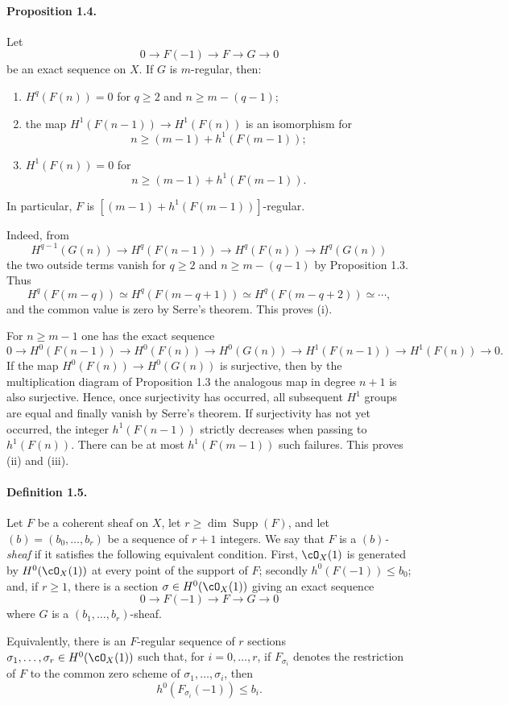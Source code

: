 \documentclass[11pt]{article}
\theoremstyle{plain}
\theoremstyle{definition}
\theoremstyle{remark}
\begin{document}
\paragraph{Proposition 1.4.}
Let
\[
0\to F(-1)\to F\to G\to0
\]
be an exact sequence on $X$. If $G$ is $m$-regular, then:
\begin{enumerate}[label=\roman*)]
\item $H^q(F(n))=0$ for $q\geq2$ and $n\geq m-(q-1)$;
\item the map $H^1(F(n-1))\to H^1(F(n))$ is an isomorphism for
\[
n\geq (m-1)+h^1(F(m-1));
\]
\item $H^1(F(n))=0$ for
\[
n\geq (m-1)+h^1(F(m-1)).
\]
\end{enumerate}
In particular, $F$ is $[(m-1)+h^1(F(m-1))]$-regular.

Indeed, from
\[
H^{q-1}(G(n))\to H^q(F(n-1))\to H^q(F(n))\to H^q(G(n))
\]
the two outside terms vanish for $q\geq2$ and $n\geq m-(q-1)$ by Proposition 1.3. Thus
\[
H^q(F(m-q))\simeq H^q(F(m-q+1))\simeq H^q(F(m-q+2))\simeq\cdots,
\]
and the common value is zero by Serre's theorem. This proves (i).

For $n\geq m-1$ one has the exact sequence
\[
0\to H^0(F(n-1))\to H^0(F(n))\to H^0(G(n))\to H^1(F(n-1))\to H^1(F(n))\to0.
\]
If the map $H^0(F(n))\to H^0(G(n))$ is surjective, then by the multiplication diagram of Proposition 1.3 the analogous map in degree $n+1$ is also surjective. Hence, once surjectivity has occurred, all subsequent $H^1$ groups are equal and finally vanish by Serre's theorem. If surjectivity has not yet occurred, the integer $h^1(F(n-1))$ strictly decreases when passing to $h^1(F(n))$. There can be at most $h^1(F(m-1))$ such failures. This proves (ii) and (iii).

\paragraph{Definition 1.5.}
Let $F$ be a coherent sheaf on $X$, let $r\geq \dim\operatorname{Supp}(F)$, and let $(b)=(b_0,\ldots,b_r)$ be a sequence of $r+1$ integers. We say that $F$ is a \emph{$(b)$-sheaf} if it satisfies the following equivalent condition. First, $\cO_X(1)$ is generated by $H^0(\cO_X(1))$ at every point of the support of $F$; secondly $h^0(F(-1))\leq b_0$; and, if $r\geq1$, there is a section $\sigma\in H^0(\cO_X(1))$ giving an exact sequence
\[
0\to F(-1)\to F\to G\to0
\]
where $G$ is a $(b_1,\ldots,b_r)$-sheaf.

Equivalently, there is an $F$-regular sequence of $r$ sections $\sigma_1,\ldots,\sigma_r\in H^0(\cO_X(1))$ such that, for $i=0,\ldots,r$, if $F_{\sigma_i}$ denotes the restriction of $F$ to the common zero scheme of $\sigma_1,\ldots,\sigma_i$, then
\[
h^0(F_{\sigma_i}(-1))\leq b_i.
\]
\end{document}

